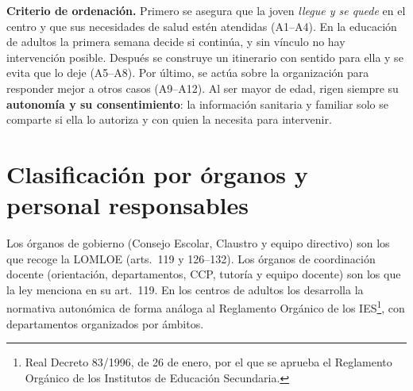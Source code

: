 \documentclass[11pt,a4paper]{article}
\begin{document}
\textbf{Criterio de ordenación.} Primero se asegura que la joven
\emph{llegue y se quede} en el centro y que sus necesidades de salud estén
atendidas (A1--A4). En la educación de adultos la primera semana decide si
continúa, y sin vínculo no hay intervención posible. Después se construye un
itinerario con sentido para ella y se evita que lo deje (A5--A8). Por último,
se actúa sobre la organización para responder mejor a otros casos (A9--A12).
Al ser mayor de edad, rigen siempre su \textbf{autonomía y su consentimiento}:
la información sanitaria y familiar solo se comparte si ella lo autoriza y con
quien la necesita para intervenir.

\section{Clasificación por órganos y personal responsables}
Los órganos de gobierno (Consejo Escolar, Claustro y equipo directivo) son los
que recoge la LOMLOE (arts.~119 y 126--132). Los órganos de coordinación docente
(orientación, departamentos, CCP, tutoría y equipo docente) son los que la ley
menciona en su art.~119. En los centros de adultos los desarrolla la normativa
autonómica de forma análoga al Reglamento Orgánico de los IES\footnote{Real
Decreto 83/1996, de 26 de enero, por el que se aprueba el Reglamento Orgánico de
los Institutos de Educación Secundaria.}, con departamentos organizados por
ámbitos.
\end{document}
